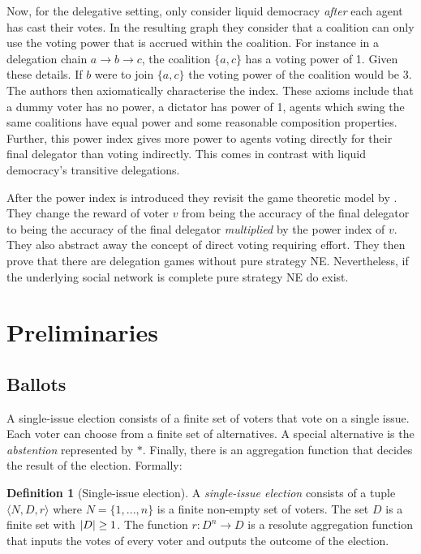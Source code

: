\documentclass[11pt,a4paper, titlepage]{article}
\DeclarePairedDelimiter\abs{\lvert}{\rvert}
\theoremstyle{definition}
\newtheorem{definition}[theorem]{Definition}
\begin{document}
Now, for the delegative setting, \citeauthor{zhang2021power} only consider liquid democracy \emph{after} each agent has cast their votes.
In the resulting graph they consider that a coalition can only use the voting power that is accrued within the coalition. 
For instance in a delegation chain $a \to b \to c$, the coalition $\{a, c\}$ has a voting power of 1.
Given these details. If $b$ were to join $\{a, c\}$ the voting power of the coalition would be 3.
The authors then axiomatically characterise the index. These axioms include that a dummy voter has no power, a dictator has power of 1, agents which swing the same coalitions have equal power and some reasonable composition properties.
Further, this power index gives more power to agents voting directly for their final delegator than voting indirectly.
This comes in contrast with liquid democracy's transitive delegations.

After the power index is introduced they revisit the game theoretic model by \citet{bloembergen2019rational}.
They change the reward of voter $v$ from being the accuracy of the final delegator to being the accuracy of the final delegator \emph{multiplied} by the power index of $v$.
They also abstract away the concept of direct voting requiring effort.
They then prove that there are delegation games without pure strategy NE.
Nevertheless, if the underlying social network is complete pure strategy NE do exist.




\newpage

\section{Preliminaries}

\subsection{Ballots}

A single-issue election consists of a finite set of voters that vote on a single issue. 
Each voter can choose from a  finite set of alternatives. 
A special alternative is the \emph{abstention} represented by $*$. 
Finally, there is an aggregation function that decides the result of the election. 
Formally:

\begin{definition}[Single-issue election]
    A \emph{single-issue election} consists of a tuple $\langle N, D, r\rangle $ where $N = \{1,..., n\} $ is a finite non-empty set of voters. The set $D$ is a finite set with $\abs{D} \geq 1$. The function $r \colon D^n \longrightarrow D$ is a resolute aggregation function that inputs the votes of every voter and outputs the outcome of the election.
\end{definition}
\end{document}

